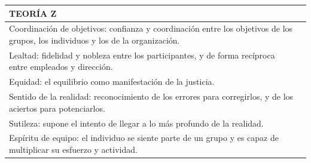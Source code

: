 \documentclass[
]{krantz}
\begin{document}
\begin{longtable}[]{@{}ll@{}}
\toprule
\begin{minipage}[b]{0.84\columnwidth}\raggedright
TEORÍA Z\strut
\end{minipage} & \begin{minipage}[b]{0.10\columnwidth}\raggedright
\strut
\end{minipage}\tabularnewline
\midrule
\endhead
\begin{minipage}[t]{0.84\columnwidth}\raggedright
Coordinación de objetivos: confianza y coordinación entre los objetivos de los grupos, los individuos y los de la organización.\strut
\end{minipage} & \begin{minipage}[t]{0.10\columnwidth}\raggedright
\strut
\end{minipage}\tabularnewline
\begin{minipage}[t]{0.84\columnwidth}\raggedright
Lealtad: fidelidad y nobleza entre los participantes, y de forma recíproca entre empleados y dirección.\strut
\end{minipage} & \begin{minipage}[t]{0.10\columnwidth}\raggedright
\strut
\end{minipage}\tabularnewline
\begin{minipage}[t]{0.84\columnwidth}\raggedright
Equidad: el equilibrio como manifestación de la justicia.\strut
\end{minipage} & \begin{minipage}[t]{0.10\columnwidth}\raggedright
\strut
\end{minipage}\tabularnewline
\begin{minipage}[t]{0.84\columnwidth}\raggedright
Sentido de la realidad: reconocimiento de los errores para corregirlos, y de los aciertos para potenciarlos.\strut
\end{minipage} & \begin{minipage}[t]{0.10\columnwidth}\raggedright
\strut
\end{minipage}\tabularnewline
\begin{minipage}[t]{0.84\columnwidth}\raggedright
Sutileza: supone el intento de llegar a lo más profundo de la realidad.\strut
\end{minipage} & \begin{minipage}[t]{0.10\columnwidth}\raggedright
\strut
\end{minipage}\tabularnewline
\begin{minipage}[t]{0.84\columnwidth}\raggedright
Espíritu de equipo: el individuo se siente parte de un grupo y es capaz de multiplicar su esfuerzo y actividad.\strut
\end{minipage} & \begin{minipage}[t]{0.10\columnwidth}\raggedright
\strut
\end{minipage}\tabularnewline
\bottomrule
\end{longtable}
\end{document}
